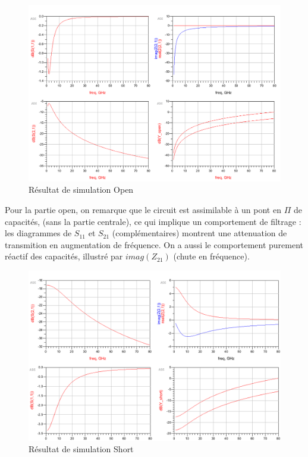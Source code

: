 \documentclass[a4paper]{article}
\begin{document}
\begin{figure}[!htb]
\begin{center}
  \includegraphics[scale=0.35]{de-embedding_open_sim.png}
  \caption{R\'esultat de simulation Open}
  \label{de-embedding-sim-open}
\end{center}
\end{figure}

Pour la partie open, on remarque que le circuit est assimilable \`a un pont en $\Pi$ de capacit\'es, (sans la partie
centrale), ce qui implique un comportement de filtrage : les diagrammes de $S_{11}$ et $S_{21}$ (compl\'ementaires)
montrent une attenuation de transmition en augmentation de fr\'equence. On a aussi le comportement purement r\'eactif
des capacit\'es, illustr\'e par $imag(Z_{21})$ (chute en fr\'equence).

\begin{figure}[!htb]
\begin{center}
  \includegraphics[scale=0.35]{de-embedding_short_sim.png}
  \caption{R\'esultat de simulation Short}
  \label{de-embedding-sim-short}
\end{center}
\end{figure}
\end{document}
